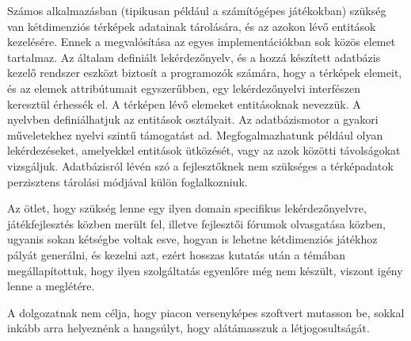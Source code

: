 
Számos alkalmazásban (tipikusan például a számítógépes játékokban) szükség  van kétdimenziós térképek adatainak tárolására, és az azokon lévő entitások kezelésére. Ennek a megvalósítása az egyes implementációkban sok közös elemet tartalmaz. Az általam definiált lekérdezőnyelv, és a hozzá készített adatbázis kezelő rendszer eszközt biztosít a programozók számára, hogy a térképek elemeit, és az elemek attribútumait egyszerűbben, egy lekérdezőnyelvi interfészen keresztül érhessék el. A térképen lévő elemeket entitásoknak nevezzük. A nyelvben definiálhatjuk az entitások osztályait. Az adatbázismotor a gyakori műveletekhez nyelvi szintű támogatást ad. Megfogalmazhatunk például olyan lekérdezéseket, amelyekkel entitások ütközését, vagy az azok közötti távolságokat vizsgáljuk. Adatbázisról lévén szó a fejlesztőknek nem szükséges a térképadatok perzisztens tárolási módjával külön foglalkozniuk.

Az ötlet, hogy szükség lenne egy ilyen domain specifikus lekérdezőnyelvre, játékfejlesztés közben merült fel, illetve fejlesztői fórumok olvasgatása közben, ugyanis sokan kétségbe voltak esve, hogyan is lehetne kétdimenziós játékhoz pályát generálni, és kezelni azt, ezért hosszas kutatás után a témában megállapítottuk, hogy ilyen szolgáltatás egyenlőre még nem készült, viszont igény lenne a meglétére.

A dolgozatnak nem célja, hogy piacon versenyképes szoftvert mutasson be, sokkal inkább arra helyeznénk a hangsúlyt, hogy alátámasszuk a létjogosultságát.

\begin{comment}
Le kell majd írni, hogy az elnevezések (pl.: azeroth), és a példák miért ilyenek.
\end{comment}
